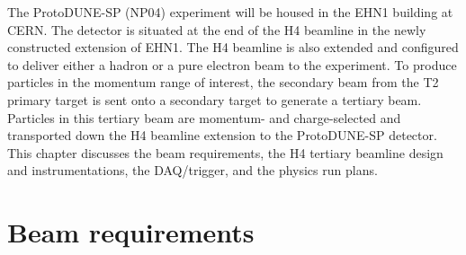 The ProtoDUNE-SP (NP04) experiment will be housed in the EHN1 building at CERN. The detector is situated at the end of the H4 beamline in the newly constructed extension of EHN1. The H4 beamline is also extended and configured to deliver either a hadron or a pure electron beam to the experiment. To produce particles in the momentum range of interest, the secondary beam from the T2 primary target is sent onto a secondary target to generate a tertiary beam. Particles in this tertiary beam are momentum- and charge-selected and transported down the H4 beamline extension to the ProtoDUNE-SP detector. 
This chapter discusses the beam requirements, the H4 tertiary beamline design and instrumentations, 
the DAQ/trigger, and the physics run plans.  

\section{Beam requirements}
\label{sec:beamrequirements}


